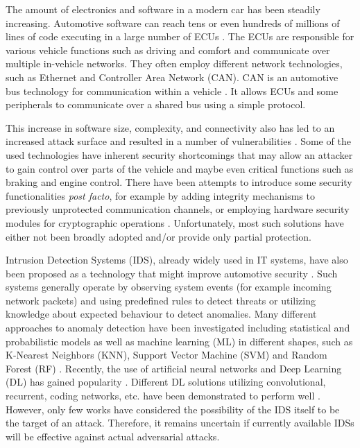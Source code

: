 \documentclass[conference]{IEEEtran}
\begin{document}
The amount of electronics and software in a modern car has been steadily increasing. Automotive software can reach tens or even hundreds of millions of lines of code executing in a large number of ECUs \cite{IEEE_This_Car_Runs_On_Code_2009}. The ECUs are responsible for various vehicle functions such as driving and comfort and communicate over multiple in-vehicle networks. They often employ different network technologies, such as Ethernet and Controller Area Network (CAN). CAN is an automotive bus technology for communication within a vehicle \cite{Bosh_CAN_Specification_1991}. It
allows ECUs and some peripherals to communicate over a shared bus using a simple protocol.

This increase in software size, complexity, and connectivity also has led to an increased attack surface and resulted in a number of vulnerabilities \cite{Comprehensive_Experimental_Analyses_Automotive_Attack_Surfaces_2011}.
Some of the used technologies have inherent security shortcomings that may allow an attacker to gain control over parts of the vehicle and maybe even critical functions such as braking and engine control. There have been attempts to introduce some security functionalities \textit{post facto}, for example by adding integrity mechanisms to previously unprotected communication channels, or employing hardware security modules for cryptographic operations \cite{Efficient_In_Vehicle_Delayed_Data_Authentication_Compound_Message_Authentication_Code_2008, State_Of_The_Art_Embedding_Security_In_Vehicles_2007}. Unfortunately, most such solutions have either not been broadly adopted and/or provide only partial protection.

Intrusion Detection Systems (IDS), already widely used in IT systems, have also been proposed as a technology that might improve automotive security \cite{strandberg2021}. Such systems generally operate by observing system events (for example incoming network packets) and using predefined rules to detect threats or utilizing knowledge about expected behaviour to detect anomalies. Many different approaches to anomaly detection have been investigated including statistical and probabilistic models as well as machine learning (ML) in different shapes, such as
%
K-Nearest Neighbors (KNN), Support Vector Machine (SVM)
and Random Forest (RF) \cite{survey_data_mining_ml_methods_cyber_security_intrusion_detection_2016}. Recently, the use of artificial neural networks and Deep Learning (DL) has gained popularity \cite{Deep_Learning_Anomaly_Detection_Survey_2019}. Different DL solutions utilizing convolutional, recurrent, coding networks, etc. have been demonstrated to perform well \cite{CANIntelliIDS_2021, CANet_2020, CANTransfer_2020}. However, only few works have considered the possibility of the IDS itself to be the target of an attack. Therefore, it remains uncertain if currently available IDSs will be effective against actual adversarial attacks.
\end{document}
